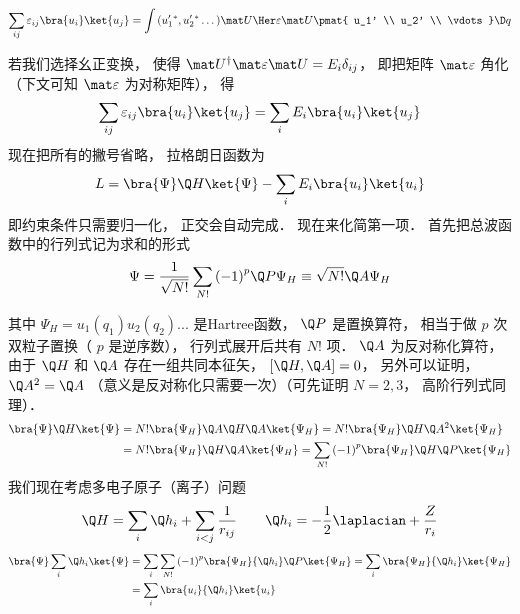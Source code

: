\begin{equation}
\sum\limits_{ij} { \varepsilon_{ij} \bra{u_i}\ket{u_j} }
= \int {(u'_1{}^* ,u'_2{}^* \dots){\mat U \Her} \varepsilon \mat U
\pmat{ u_1' \\ u_2' \\ \vdots}
\D q}
\end{equation}


若我们选择幺正变换， 使得 ${\mat U^\dag }\mat \varepsilon \mat U = {E_i}{\delta_{ij}}$， %
即把矩阵 $\mat \varepsilon $ 角化（下文可知 $\mat\varepsilon$ 为对称矩阵）， 得
 \begin{equation}
\sum\limits_{ij} {\varepsilon _{ij}} \bra{u_i}\ket{u_j}
 = \sum\limits_i {E_i}  \bra{u_i}\ket{u_j}
\end{equation}
现在把所有的撇号省略， 拉格朗日函数为
\begin{equation}
L =\bra{\Psi}\Q H \ket{\Psi}  - \sum\limits_i E_i \bra{u_i}\ket{u_i}
\end{equation}
即约束条件只需要归一化， 正交会自动完成． 现在来化简第一项． 首先把总波函数中的行列式记为求和的形式
 \begin{equation}
\Psi  = \frac{1}{{\sqrt {N!} }}\sum\limits_{N!} {{{( - 1)}^p}\Q P{\Psi _H}}  \equiv \sqrt {N!} \Q A{\Psi _H}
\end{equation}

其中 ${\Psi _H} = {u_1}({q_1}){u_2}({q_2})...$ 是Hartree函数，  $\Q P$ 是置换算符， 相当于做 $p$ 次双粒子置换（ $p$ 是逆序数）， 行列式展开后共有 $N!$ 项．  $\Q A$ 为反对称化算符， 由于 $\Q H$ 和 $\Q A$ 存在一组共同本征矢， $[\Q H,\Q A] = 0$，  另外可以证明， ${\Q A^2} = \Q A$ （意义是反对称化只需要一次）（可先证明 $N = 2,3$，  高阶行列式同理）．
\begin{equation}
\begin{aligned}
  \bra{\Psi}\Q H\ket{\Psi}  &= N!\bra{ {{\Psi _H}}}\Q A\Q H\Q A \ket{{\Psi _H}} = N!\bra{ {{\Psi _H}} }\Q H{\Q A^2}\ket{{{\Psi _H}}} \\
  &= N!\bra{{{\Psi _H}} }\Q H\Q A\ket{{{\Psi _H}}}   = \sum\limits_{N!} {{( - 1)}^p}\bra{\Psi _H}\Q H\Q P\ket{\Psi _H}\\ 
\end{aligned}
\end{equation}
我们现在考虑多电子原子（离子）问题
\begin{equation}
\Q H = \sum\limits_i {{\Q h_i}}  + \sum\limits_{i < j} {\frac{1}{{{r_{ij}}}}} 
\qquad
{\Q h_i} =  - \frac{1}{2}{\laplacian} + \frac{Z}{{{r_i}}}
\end{equation}
\begin{equation}
\begin{aligned}
\bra{\Psi}\sum\limits_i {{\Q h_i}} \ket{\Psi} & = \sum\limits_i {\sum\limits_{N!} {{{( - 1)}^p}\bra{\Psi _H}{\Q h_i}\Q P \ket{{\Psi _H}} } }  = \sum\limits_i {\bra{\Psi _H} {\Q h_i} \ket{{\Psi _H}}}  \\
&= \sum\limits_i {\bra{u_i}{\Q h_i}\ket{{u_i}}} 
\end{aligned}
\end{equation}
 
